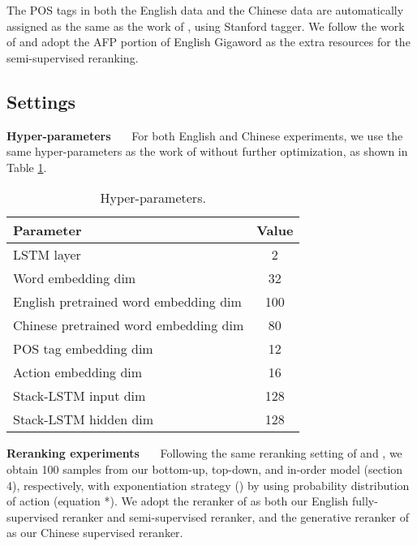 \documentclass[11pt,letterpaper]{article}
\begin{document}
The POS tags in both the English data and the Chinese data are automatically assigned as the same as the work of , using Stanford tagger.
We follow the work of  and adopt the AFP portion of English Gigaword as the extra resources for the semi-supervised reranking.

\subsection{Settings}
\indent \textbf{Hyper-parameters}~~~
For both English and Chinese experiments, we use the same hyper-parameters as the work of  without further optimization, as shown in Table \ref{parameter}.
\begin{table}[!tp]
\begin{center}
\renewcommand{\arraystretch}{0.8}
\begin{tabular}{>{\small}l|>{\small}c}
\hline
Parameter & Value \\
\hline
\hline
LSTM layer & 2 \\
Word embedding dim & 32 \\
English pretrained word embedding dim & 100 \\
Chinese pretrained word embedding dim & 80 \\
POS tag embedding dim & 12 \\
Action embedding dim & 16 \\
Stack-LSTM input dim & 128 \\
Stack-LSTM hidden dim & 128 \\
\hline
\end{tabular}
\end{center}
\caption{\label{parameter} Hyper-parameters.}
\end{table}

\noindent\textbf{Reranking experiments}~~~
Following the same reranking setting of  and , we obtain 100 samples from our bottom-up, top-down, and in-order model (section 4), respectively, with exponentiation strategy () by using probability distribution of action (equation *).
We adopt the reranker of  as both our English fully-supervised reranker and semi-supervised reranker, and the generative reranker of  as our Chinese supervised reranker.
\end{document}
